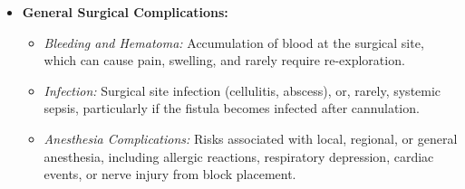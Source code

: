 \begin{itemize}
  \item \textbf{General Surgical Complications:}
  \begin{itemize}
    \item \textit{Bleeding and Hematoma:} Accumulation of blood at the surgical site, which can cause pain, swelling, and rarely require re-exploration.
    \item \textit{Infection:} Surgical site infection (cellulitis, abscess), or, rarely, systemic sepsis, particularly if the fistula becomes infected after cannulation.
    \item \textit{Anesthesia Complications:} Risks associated with local, regional, or general anesthesia, including allergic reactions, respiratory depression, cardiac events, or nerve injury from block placement.
  \end{itemize}
  

\end{itemize}
